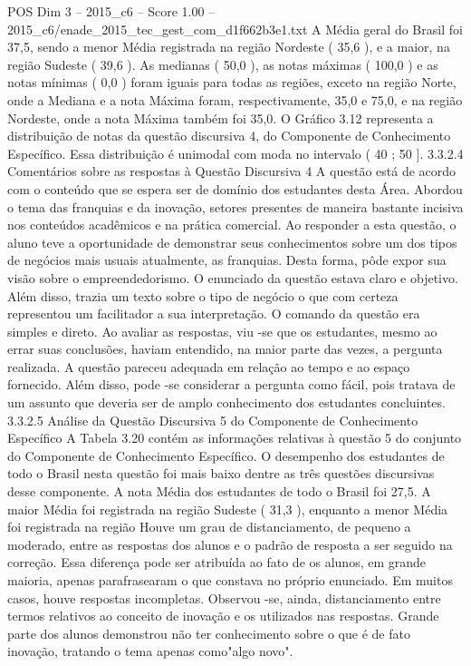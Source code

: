 \begin{textsample}{POS Dim 3 – 2015\_c6 – Score 1.00 – 2015\_c6/enade\_2015\_tec\_gest\_com\_d1f662b3e1.txt}
A Média geral do Brasil foi 37,5, sendo a menor Média registrada na região Nordeste ( 35,6 ), e a maior, na região Sudeste ( 39,6 ).
As medianas ( 50,0 ), as notas máximas ( 100,0 ) e as notas mínimas ( 0,0 ) foram iguais para todas as regiões, exceto na região Norte, onde a Mediana e a nota Máxima foram, respectivamente, 35,0 e 75,0, e na região Nordeste, onde a nota Máxima também foi 35,0.
O Gráfico 3.12 representa a distribuição de notas da questão discursiva 4, do Componente de Conhecimento Específico.
Essa distribuição é unimodal com moda no intervalo ( 40 ; 50 ]. 3.3.2.4 Comentários sobre as respostas à Questão Discursiva 4 A questão está de acordo com o conteúdo que se espera ser de domínio dos estudantes desta Área.
Abordou o tema das franquias e da inovação, setores presentes de maneira bastante incisiva nos conteúdos acadêmicos e na prática comercial.
Ao responder a esta questão, o aluno teve a oportunidade de demonstrar seus conhecimentos sobre um dos tipos de negócios mais usuais atualmente, as franquias.
Desta forma, pôde expor sua visão sobre o empreendedorismo.
O enunciado da questão estava claro e objetivo.
Além disso, trazia um texto sobre o tipo de negócio o que com certeza representou um facilitador a sua interpretação.
O comando da questão era simples e direto.
Ao avaliar as respostas, viu -se que os estudantes, mesmo ao errar suas conclusões, haviam entendido, na maior parte das vezes, a pergunta realizada.
A questão pareceu adequada em relação ao tempo e ao espaço fornecido.
Além disso, pode -se considerar a pergunta como fácil, pois tratava de um assunto que deveria ser de amplo conhecimento dos estudantes concluintes. 3.3.2.5 Análise da Questão Discursiva 5 do Componente de Conhecimento Específico A Tabela 3.20 contém as informações relativas à questão 5 do conjunto do Componente de Conhecimento Específico.
O desempenho dos estudantes de todo o Brasil nesta questão foi mais baixo dentre as três questões discursivas desse componente.
A nota Média dos estudantes de todo o Brasil foi 27,5.
A maior Média foi registrada na região Sudeste ( 31,3 ), enquanto a menor Média foi registrada na região Houve um grau de distanciamento, de pequeno a moderado, entre as respostas dos alunos e o padrão de resposta a ser seguido na correção.
Essa diferença pode ser atribuída ao fato de os alunos, em grande maioria, apenas parafrasearam o que constava no próprio enunciado.
Em muitos casos, houve respostas incompletas.
Observou -se, ainda, distanciamento entre termos relativos ao conceito de inovação e os utilizados nas respostas.
Grande parte dos alunos demonstrou não ter conhecimento sobre o que é de fato inovação, tratando o tema apenas como"algo novo".

\end{textsample}
